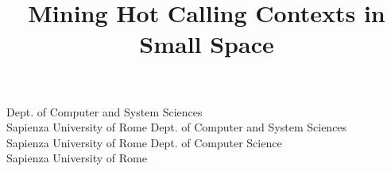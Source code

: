 \documentclass[preprint]{sigplanconf}
\begin{document}
\copyrightdata{[to be supplied]} 


\newcommand{\camil}{{$\bullet \bullet \bullet $}}
\newcommand{\irene}{{$\bullet \bullet \bullet $}}
\newcommand{\daniele}{{$\bullet \bullet \bullet $}}

\title{Mining Hot Calling Contexts in Small Space}



            {Dept. of Computer and System Sciences\\Sapienza University of Rome}
            {}
            {Dept. of Computer and System Sciences\\Sapienza University of Rome}
            {}
            {Dept. of Computer Science\\Sapienza University of Rome}
            {}

\maketitle
\end{document}
